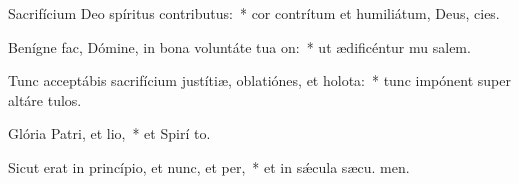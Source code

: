 \item Sacrifícium Deo spíritus contributus:~* cor contrítum et humiliátum, Deus,  cies.
\item Benígne fac, Dómine, in bona voluntáte tua on:~* ut ædificéntur mu salem.
\item Tunc acceptábis sacrifícium justítiæ, oblatiónes, et holota:~* tunc impónent super altáre  tulos.
\item Glória Patri, et lio,~* et Spirí to.
\item Sicut erat in princípio, et nunc, et per,~* et in sǽcula sæcu. men.
